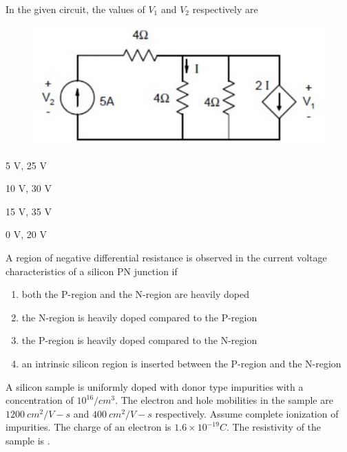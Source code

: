     \hfill{}

    \item In the given circuit, the values of $V_{1}$ and $V_{2}$ respectively are
    \begin{figure}[H]
        \centering
        \includegraphics[width=0.5\columnwidth]{figs/q18.png}
        \caption*{}
        \label{fig:q18}
    \end{figure}
    \begin{enumerate}
        \begin{multicols}{2}
            \item 5 V, 25 V
            \item 10 V, 30 V
            \item 15 V, 35 V
            \item 0 V, 20 V
        \end{multicols}
    \end{enumerate}
    
    \hfill{}

    \item A region of negative differential resistance is observed in the current voltage characteristics of a silicon PN junction if
    \begin{enumerate}
        \item both the P-region and the N-region are heavily doped
        \item the N-region is heavily doped compared to the P-region
        \item the P-region is heavily doped compared to the N-region
        \item an intrinsic silicon region is inserted between the P-region and the N-region
    \end{enumerate}
    
    \hfill{}

    \item A silicon sample is uniformly doped with donor type impurities with a concentration of $10^{16}/cm^{3}$. The electron and hole mobilities in the sample are $1200~cm^{2}/V-s$ and $400~cm^{2}/V-s$ respectively. Assume complete ionization of impurities. The charge of an electron is $1.6\times10^{-19}C$. The resistivity of the sample  is \underline{\hspace{2cm}}.
    

